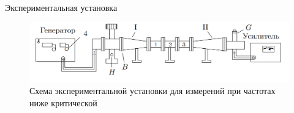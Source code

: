 \documentclass[12pt]{beamer}
\begin{document}
\begin{frame}{Экспериментальная установка}

    \begin{figure}
        \centering
        \includegraphics[scale=0.35]{fig3.PNG}
        \caption{Схема экспериментальной установки для измерений при частотах ниже критической}
        \label{fig:enter-label}
    \end{figure}
    
\end{frame}
\end{document}

